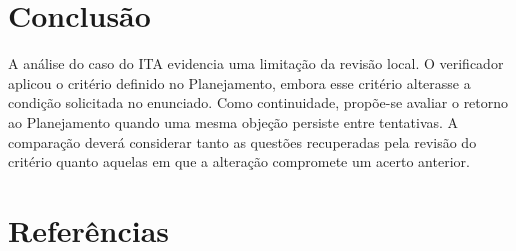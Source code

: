 \documentclass[a4paper,10pt, twocolumn]{article}
\begin{document}
\section{Conclusão}

A análise do caso do ITA evidencia uma limitação da revisão local. O verificador aplicou o critério definido no Planejamento, embora esse critério alterasse a condição solicitada no enunciado. Como continuidade, propõe-se avaliar o retorno ao Planejamento quando uma mesma objeção persiste entre tentativas. A comparação deverá considerar tanto as questões recuperadas pela revisão do critério quanto aquelas em que a alteração compromete um acerto anterior.

\section{Referências}
\printbibliography[heading=none]
\end{document}
